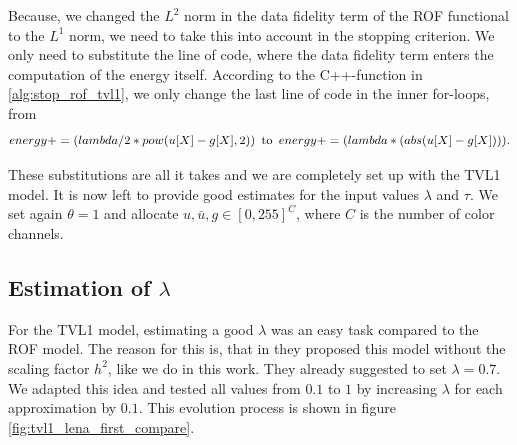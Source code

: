 \documentclass{scrreprt}
\begin{document}
            Because, we changed the $L^{2}$ norm in the data fidelity term of the ROF functional to the $L^{1}$ norm, we need to take this into account in the stopping criterion. We only need to substitute the line of code, where the data fidelity term enters the computation of the energy itself. According to the C++-function in \ref{alg:stop_rof_tvl1}, we only change the last line of code in the inner for-loops, from
                $$
                    energy += (lambda/2 * pow(u[X] - g[X], 2)) \,\,\, \textnormal{to} \,\,\, energy += (lambda * (abs(u[X] - g[X]))).
                $$

            These substitutions are all it takes and we are completely set up with the TVL1 model. It is now left to provide good estimates for the input values $\lambda$ and $\tau$. We set again $\theta = 1$ and allocate $u, \bar{u}, g \in [0, 255]^{C}$, where $C$ is the number of color channels.

            \subsection{Estimation of $\lambda$} %
            \label{sub:estimation_of_lambda_tvl1}

                For the TVL1 model, estimating a good $\lambda$ was an easy task compared to the ROF model. The reason for this is, that in \cite{Chambolle10afirst-order} they proposed this model without the scaling factor $h^{2}$, like we do in this work. They already suggested to set $\lambda = 0.7$. We adapted this idea and tested all values from $0.1$ to $1$ by increasing $\lambda$ for each approximation by $0.1$. This evolution process is shown in figure \ref{fig:tvl1_lena_first_compare}.
                
\end{document}

